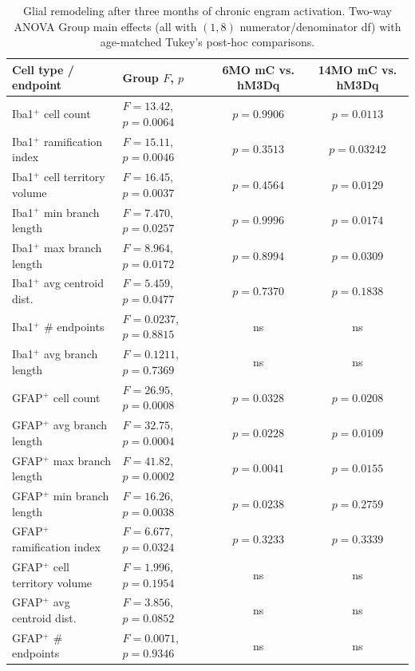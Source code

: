 \documentclass[11pt]{article}
\begin{document}
\begin{table}[h]
\centering
\caption{Glial remodeling after three months of chronic engram activation. Two-way ANOVA Group main effects (all with $(1,8)$ numerator/denominator df) with age-matched Tukey's post-hoc comparisons.}
\label{tab:glia}
\begin{tabular}{llcc}
\toprule
Cell type / endpoint & Group $F$, $p$ & 6MO mC vs. hM3Dq & 14MO mC vs. hM3Dq \\
\midrule
Iba1$^{+}$ cell count           & $F=13.42$, $p=0.0064$ & $p=0.9906$ & $p=0.0113$ \\
Iba1$^{+}$ ramification index   & $F=15.11$, $p=0.0046$ & $p=0.3513$ & $p=0.03242$ \\
Iba1$^{+}$ cell territory volume & $F=16.45$, $p=0.0037$ & $p=0.4564$ & $p=0.0129$ \\
Iba1$^{+}$ min branch length    & $F=7.470$, $p=0.0257$ & $p=0.9996$ & $p=0.0174$ \\
Iba1$^{+}$ max branch length    & $F=8.964$, $p=0.0172$ & $p=0.8994$ & $p=0.0309$ \\
Iba1$^{+}$ avg centroid dist.   & $F=5.459$, $p=0.0477$ & $p=0.7370$ & $p=0.1838$ \\
Iba1$^{+}$ \# endpoints         & $F=0.0237$, $p=0.8815$ & ns & ns \\
Iba1$^{+}$ avg branch length    & $F=0.1211$, $p=0.7369$ & ns & ns \\
GFAP$^{+}$ cell count           & $F=26.95$, $p=0.0008$ & $p=0.0328$ & $p=0.0208$ \\
GFAP$^{+}$ avg branch length    & $F=32.75$, $p=0.0004$ & $p=0.0228$ & $p=0.0109$ \\
GFAP$^{+}$ max branch length    & $F=41.82$, $p=0.0002$ & $p=0.0041$ & $p=0.0155$ \\
GFAP$^{+}$ min branch length    & $F=16.26$, $p=0.0038$ & $p=0.0238$ & $p=0.2759$ \\
GFAP$^{+}$ ramification index   & $F=6.677$, $p=0.0324$ & $p=0.3233$ & $p=0.3339$ \\
GFAP$^{+}$ cell territory volume & $F=1.996$, $p=0.1954$ & ns & ns \\
GFAP$^{+}$ avg centroid dist.   & $F=3.856$, $p=0.0852$ & ns & ns \\
GFAP$^{+}$ \# endpoints         & $F=0.0071$, $p=0.9346$ & ns & ns \\
\bottomrule
\end{tabular}
\end{table}
\end{document}
